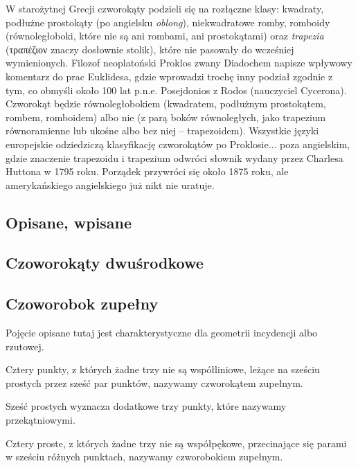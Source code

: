 W starożytnej Grecji czworokąty podzieli się na rozłączne klasy: kwadraty, podłużne prostokąty (po angielsku \emph{oblong}), niekwadratowe romby, romboidy (równoległoboki, które nie są ani rombami, ani prostokątami) oraz \emph{trapezia} (τραπέζιον znaczy dosłownie stolik), które nie pasowały do wcześniej wymienionych.
Filozof neoplatoński Proklos zwany Diadochem napisze wpływowy komentarz do prac Euklidesa, gdzie wprowadzi trochę inny podział zgodnie z tym, co obmyśli około 100 lat p.n.e. Posejdonios z Rodos (nauczyciel Cycerona).
Czworokąt będzie równoległobokiem (kwadratem, podłużnym prostokątem, rombem, romboidem) albo nie (z parą boków równoległych, jako trapezium równoramienne lub ukośne albo bez niej -- trapezoidem).
Wszystkie języki europejskie odziedziczą klasyfikację czworokątów po Proklosie... poza angielskim, gdzie znaczenie trapezoidu i trapezium odwróci słownik wydany przez Charlesa Huttona w 1795 roku.
Porządek przywróci się około 1875 roku, ale amerykańskiego angielskiego już nikt nie uratuje.

\subsection{Opisane, wpisane}


\subsection{Czoworokąty dwuśrodkowe}


%
%
\subsection{Czoworobok zupełny}
Pojęcie opisane tutaj jest charakterystyczne dla geometrii incydencji albo rzutowej.

\begin{definition}
	Cztery punkty, z których żadne trzy nie są współliniowe, leżące na sześciu prostych przez sześć par punktów, nazywamy czworokątem zupełnym.
\end{definition}

Sześć prostych wyznacza dodatkowe trzy punkty, które nazywamy przekątniowymi.

\begin{definition}
	Cztery proste, z których żadne trzy nie są współpękowe, przecinające się parami w sześciu różnych punktach, nazywamy czworobokiem zupełnym.
\end{definition}


